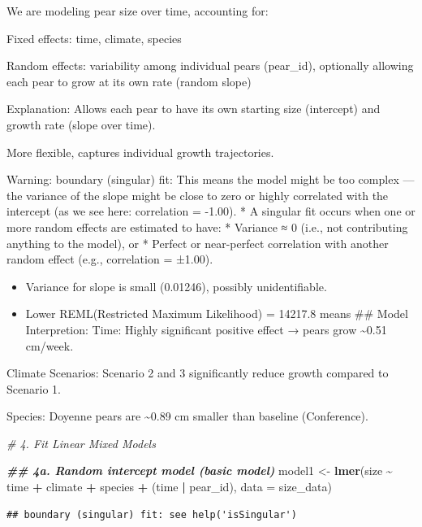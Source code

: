 \documentclass[
]{article}
\newenvironment{Shaded}{\begin{snugshade}}{\end{snugshade}}
\newcommand{\AttributeTok}[1]{\textcolor[rgb]{0.13,0.29,0.53}{#1}}
\newcommand{\CommentTok}[1]{\textcolor[rgb]{0.56,0.35,0.01}{\textit{#1}}}
\newcommand{\DocumentationTok}[1]{\textcolor[rgb]{0.56,0.35,0.01}{\textbf{\textit{#1}}}}
\newcommand{\FunctionTok}[1]{\textcolor[rgb]{0.13,0.29,0.53}{\textbf{#1}}}
\newcommand{\NormalTok}[1]{#1}
\newcommand{\OtherTok}[1]{\textcolor[rgb]{0.56,0.35,0.01}{#1}}
\newcommand{\SpecialCharTok}[1]{\textcolor[rgb]{0.81,0.36,0.00}{\textbf{#1}}}
\providecommand{\tightlist}{%
  \setlength{\itemsep}{0pt}\setlength{\parskip}{0pt}}
\begin{document}
We are modeling pear size over time, accounting for:

Fixed effects: time, climate, species

Random effects: variability among individual pears (pear\_id),
optionally allowing each pear to grow at its own rate (random slope)

Explanation: Allows each pear to have its own starting size (intercept)
and growth rate (slope over time).

More flexible, captures individual growth trajectories.

Warning: boundary (singular) fit: This means the model might be too
complex --- the variance of the slope might be close to zero or highly
correlated with the intercept (as we see here: correlation = -1.00). * A
singular fit occurs when one or more random effects are estimated to
have: * Variance ≈ 0 (i.e., not contributing anything to the model), or
* Perfect or near-perfect correlation with another random effect (e.g.,
correlation = ±1.00).

\begin{itemize}
\tightlist
\item
  Variance for slope is small (0.01246), possibly unidentifiable.
\item
  Lower REML(Restricted Maximum Likelihood) = 14217.8 means \#\# Model
  Interpretion: Time: Highly significant positive effect → pears grow
  \textasciitilde0.51 cm/week.
\end{itemize}

Climate Scenarios: Scenario 2 and 3 significantly reduce growth compared
to Scenario 1.

Species: Doyenne pears are \textasciitilde0.89 cm smaller than baseline
(Conference).

\begin{Shaded}
\begin{Highlighting}[]
\CommentTok{\# 4. Fit Linear Mixed Models}

\DocumentationTok{\#\# 4a. Random intercept model (basic model)}
\NormalTok{model1 }\OtherTok{\textless{}{-}} \FunctionTok{lmer}\NormalTok{(size }\SpecialCharTok{\textasciitilde{}}\NormalTok{ time }\SpecialCharTok{+}\NormalTok{ climate }\SpecialCharTok{+}\NormalTok{ species }\SpecialCharTok{+}\NormalTok{ (time }\SpecialCharTok{|}\NormalTok{ pear\_id), }\AttributeTok{data =}\NormalTok{ size\_data)}
\end{Highlighting}
\end{Shaded}

\begin{verbatim}
## boundary (singular) fit: see help('isSingular')
\end{verbatim}
\end{document}
